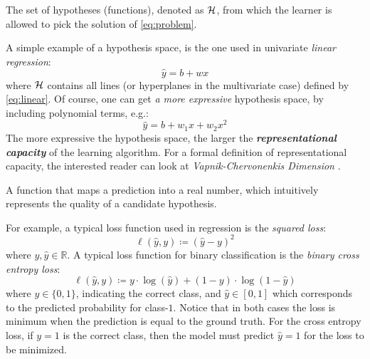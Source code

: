 \begin{definition}
	The set of hypotheses (functions), denoted as $\mathcal{H}$, from which the
	learner is allowed to pick the solution of \Equation{} \ref{eq:problem}.
\end{definition}

A simple example of a hypothesis space, is the one used in univariate
\emph{linear regression}:
\begin{equation}
	\label{eq:linear}
	\hat{y} = b + w x
\end{equation}
where $\mathcal{H}$ contains all lines (or hyperplanes in the multivariate case)
defined by \Equation{} \ref{eq:linear}. Of course, one can get \emph{a
more expressive} hypothesis space, by including polynomial terms, e.g.:
\begin{equation}
	\label{eq:polynomial}
	\hat{y} = b + w_1 x + w_2 x^2
\end{equation}
The more expressive the hypothesis space, the larger the
\emph{\textbf{representational capacity}} of
the learning algorithm. For a formal definition of representational capacity,
the interested reader can look at \emph{Vapnik-Chervonenkis
Dimension} \parencite{Hastie2009}.

\begin{definition}
	A function that maps a prediction into a real number, which intuitively
	represents the quality of a candidate hypothesis.
\end{definition}

For example, a typical loss function used in regression is the \emph{squared
loss}:
\begin{equation}
	\label{eq:squared_loss}
	\ell(\hat{y}, y) \coloneqq (\hat{y} - y)^2
\end{equation}
where $y, \hat{y} \in \mathbb{R}$. A typical loss function for binary
classification is the \emph{binary cross entropy
loss}:
\begin{equation}
	\label{eq:cross_entropy}
	\ell(\hat{y}, y) \coloneqq y \cdot \log (\hat{y})
	+ (1 - y) \cdot \log (1 - \hat{y})
\end{equation}
where $y \in \{0, 1\}$, indicating the correct class, and $\hat{y} \in [0, 1]$
which corresponds to the predicted probability for class-$1$. Notice that in
both cases the loss is minimum when the prediction is equal to the ground truth.
For the cross entropy loss, if $y=1$ is the correct class, then the model must
predict $\hat{y}=1$ for the loss to be minimized.

